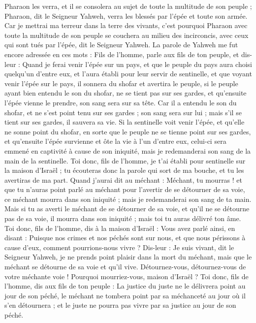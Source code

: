 \begin{multicols}{2}
Pharaon les verra, et il se consolera au sujet de toute la multitude de son peuple ; Pharaon, dit le Seigneur Yahweh, verra les blessés par l'épée et toute son armée.
Car je mettrai ma terreur dans la terre des vivants, c'est pourquoi Pharaon avec toute la multitude de son peuple se couchera au milieu des incirconcis, avec ceux qui sont tués par l'épée, dit le Seigneur Yahweh.
\VerseOne{}La parole de Yahweh me fut encore adressée en ces mots :
Fils de l’homme, parle aux fils de ton peuple, et dis-leur : Quand je ferai venir l'épée sur un pays, et que le peuple du pays aura choisi quelqu'un d'entre eux, et l'aura établi pour leur servir de sentinelle,
et que voyant venir l'épée sur le pays, il sonnera du shofar et avertira le peuple,
si le peuple ayant bien entendu le son du shofar, ne se tient pas sur ses gardes, et qu'ensuite l'épée vienne le prendre, son sang sera sur sa tête.
Car il a entendu le son du shofar, et ne s'est point tenu sur ses gardes ; son sang sera sur lui ; mais s'il se tient sur ses gardes, il sauvera sa vie.
Si la sentinelle voit venir l'épée, et qu'elle ne sonne point du shofar, en sorte que le peuple ne se tienne point sur ses gardes, et qu'ensuite l'épée survienne et ôte la vie à l’un d'entre eux, celui-ci sera emmené en captivité à cause de son iniquité, mais je redemanderai son sang de la main de la sentinelle.
Toi donc, fils de l’homme, je t'ai établi pour sentinelle sur la maison d'Israël ; tu écouteras donc la parole qui sort de ma bouche, et tu les avertiras de ma part.
Quand j'aurai dit au méchant : Méchant, tu mourras ! et que tu n'auras point parlé au méchant pour l'avertir de se détourner de sa voie, ce méchant mourra dans son iniquité ; mais je redemanderai son sang de ta main.
Mais si tu as averti le méchant de se détourner de sa voie, et qu'il ne se détourne pas de sa voie, il mourra dans son iniquité ; mais toi tu auras délivré ton âme.
Toi donc, fils de l’homme, dis à la maison d'Israël : Vous avez parlé ainsi, en disant : Puisque nos crimes et nos péchés sont sur nous, et que nous périssons à cause d'eux, comment pourrions-nous vivre\FTNT{} ?
Dis-leur : Je suis vivant, dit le Seigneur Yahweh, je ne prends point plaisir dans la mort du méchant, mais que le méchant se détourne de sa voie et qu'il vive. Détournez-vous, détournez-vous de votre méchante voie ! Pourquoi mourriez-vous, maison d'Israël ?
Toi donc, fils de l’homme, dis aux fils de ton peuple : La justice du juste ne le délivrera point au jour de son péché, le méchant ne tombera point par sa méchanceté au jour où il s'en détournera ; et le juste ne pourra pas vivre par sa justice au jour de son péché.

\end{multicols}
